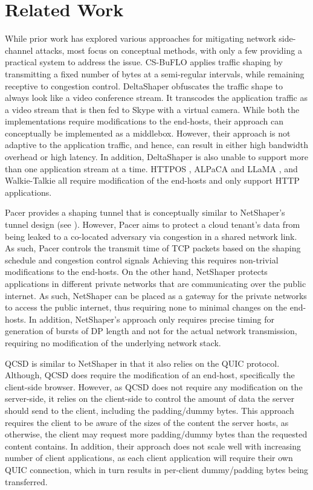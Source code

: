 \section{Related Work}
\label{sec:netshaper-related-work}

While prior work has explored various approaches for mitigating network side-channel attacks, most focus on conceptual methods, with only a few providing a practical system to address the issue.
CS-BuFLO \cite{cai2014csbuflo} applies traffic shaping by transmitting a fixed number of bytes at a semi-regular intervals, while remaining receptive to congestion control.
DeltaShaper \cite{barradas2017deltashaper} obfuscates the traffic shape to always look like a video conference stream.
It transcodes the application traffic as a video stream that is then fed to Skype with a virtual camera.
While both the implementations require modifications to the end-hosts, their approach can conceptually be implemented as a middlebox.
However, their approach is not adaptive to the application traffic, and hence, can result in either high bandwidth overhead or high latency.
In addition, DeltaShaper is also unable to support more than one application stream at a time.
HTTPOS \cite{luo2011httpos}, ALPaCA and LLaMA \cite{cherubin2017llama}, and Walkie-Talkie \cite{wang2017walkie} all require modification of the end-hosts and only support HTTP applications.

Pacer \cite{mehta2022pacer} provides a shaping tunnel that is conceptually similar to NetShaper's tunnel design (see ).
However, Pacer aims to protect a cloud tenant's data from being leaked to a co-located adversary via congestion in a shared network link.
As such, Pacer controls the transmit time of TCP packets based on the shaping schedule and congestion control signals
Achieving this requires non-trivial modifications to the end-hosts.
On the other hand, NetShaper protects applications in different private networks that are communicating over the public internet. 
As such, NetShaper can be placed as a gateway for the private networks to access the public internet, thus requiring none to minimal changes on the end-hosts.
In addition, NetShaper's approach only requires precise timing for generation of bursts of DP length and not for the actual network transmission, requiring no modification of the underlying network stack.

QCSD \cite{smith2022qcsd} is similar to NetShaper in that it also relies on the QUIC protocol.
Although, QCSD does require the modification of an end-host, specifically the client-side browser.
However, as QCSD does not require any modification on the server-side, it relies on the client-side to control the amount of data the server should send to the client, including the padding/dummy bytes. 
This approach requires the client to be aware of the sizes of the content the server hosts, as otherwise, the client may request more padding/dummy bytes than the requested content contains.
In addition, their approach does not scale well with increasing number of client applications, as each client application will require their own QUIC connection, which in turn results in per-client dummy/padding bytes being transferred.

